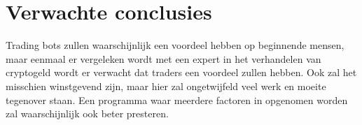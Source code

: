 \section{Verwachte conclusies}
\label{sec:verwachte_conclusies}

Trading bots zullen waarschijnlijk een voordeel hebben op beginnende mensen, maar eenmaal er vergeleken wordt met een expert in het verhandelen van cryptogeld wordt er verwacht dat traders een voordeel zullen hebben. Ook zal het misschien winstgevend zijn, maar hier zal ongetwijfeld veel werk en moeite tegenover staan. Een programma waar meerdere factoren in opgenomen worden zal waarschijnlijk ook beter presteren.

